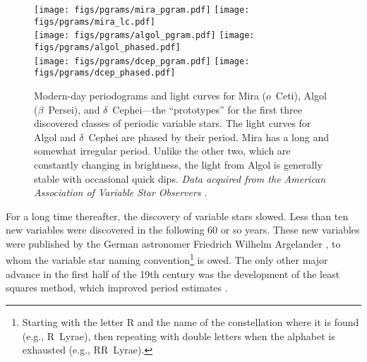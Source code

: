 \begin{figure}[p] 
    \centering
    \iffalse
    \begin{minipage}{.5\textwidth} \centering
        \hspace*{1cm}\emph{Periodogram}
    \end{minipage}%
    \begin{minipage}{.5\textwidth} \centering
        \hspace*{1cm}\emph{Light Curve}
    \end{minipage}\\
    \fi
    \texttt{[image: figs/pgrams/mira\_pgram.pdf]}%
    \texttt{[image: figs/pgrams/mira\_lc.pdf]}\\
    \vspace*{0.4cm}
    \texttt{[image: figs/pgrams/algol\_pgram.pdf]}%
    \texttt{[image: figs/pgrams/algol\_phased.pdf]}\\
    \vspace*{0.4cm}
    \texttt{[image: figs/pgrams/dcep\_pgram.pdf]}%
    \texttt{[image: figs/pgrams/dcep\_phased.pdf]}\\
    \vspace*{0.4cm}
    \caption[Light curves of the first-known periodic variable stars]{Modern-day periodograms and light curves for Mira ($o$~Ceti), Algol ($\beta$~Persei), and $\delta$~Cephei---the ``prototypes'' for the first three discovered classes of periodic variable stars. 
    The light curves for Algol and $\delta$~Cephei are phased by their period. 
    Mira has a long and somewhat irregular period. 
    Unlike the other two, which are constantly changing in brightness, the light from Algol is generally stable with occasional quick dips. 
    \emph{Data acquired from the American Association of Variable Star Observers} \citep[\textsc{AAVSO},][]{AAVSO}. 
    \label{fig:lightcurves}}
\end{figure}

For a long time thereafter, the discovery of variable stars slowed. 
Less than ten new variables were discovered in the following $60$ or so years. 
These new variables were published by the German astronomer Friedrich Wilhelm Argelander \citep{1844scja.book..122A}, to whom the variable star naming convention\footnote{ Starting with the letter R and the name of the constellation where it is found (e.g., R~Lyrae), then repeating with double letters when the alphabet is exhausted (e.g., RR~Lyrae).} is owed.
The only other major advance in the first half of the 19th century was the development of the least squares method, which improved period estimates \citep[e.g.,][]{1994JHA....25...92Z}. 

